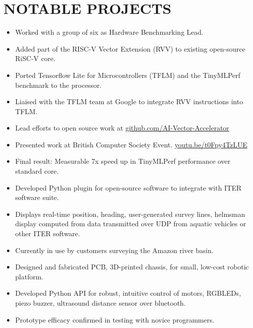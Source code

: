 

\section{NOTABLE PROJECTS}
\vspace{-4mm}
{
  {\begin{itemize}
    \item Worked with a group of six as Hardware Benchmarking Lead.
    \item Added part of the RISC-V Vector Extension (RVV) to existing open-source RiSC-V core.
    \item Ported Tensorflow Lite for Microcontrollers (TFLM) and the TinyMLPerf benchmark to the processor.
    \item Liaised with the TFLM team at Google to integrate RVV instructions into TFLM. 
    \item Lead efforts to open source work at \url{github.com/AI-Vector-Accelerator}
    \item Presented work at British Computer Society Event. \url{youtu.be/t0Fpy4TzLUE}
    \item Final result: Measurable 7x speed up in TinyMLPerf performance over standard core.
  \end{itemize} 
  }
}

{
  {\begin{itemize}
      \item Developed Python plugin for open-source software to integrate with ITER software suite.
      \item Displays real-time position, heading, user-generated survey lines, helmsman display computed from data transmitted over UDP from aquatic vehicles or other ITER software.
      \item Currently in use by customers surveying the Amazon river basin.
  \end{itemize}
  }
}

{
  {\begin{itemize}
      \item Designed and fabricated PCB, 3D-printed chassis, for small, low-cost robotic platform.
      \item Developed Python API for robust, intuitive control of motors, RGBLEDs, piezo buzzer, ultrasound distance sensor over bluetooth. 
      \item Prototype efficacy confirmed in testing with novice programmers.
  \end{itemize}
  }
}

